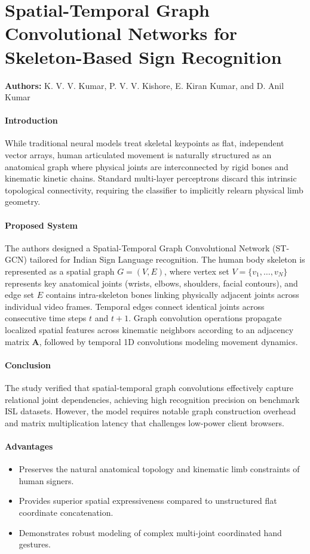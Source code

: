 \section{Spatial-Temporal Graph Convolutional Networks for Skeleton-Based Sign Recognition}
\textbf{Authors:} K. V. V. Kumar, P. V. V. Kishore, E. Kiran Kumar, and D. Anil Kumar \cite{17}

\paragraph{Introduction}
While traditional neural models treat skeletal keypoints as flat, independent vector arrays, human articulated movement is naturally structured as an anatomical graph where physical joints are interconnected by rigid bones and kinematic kinetic chains. Standard multi-layer perceptrons discard this intrinsic topological connectivity, requiring the classifier to implicitly relearn physical limb geometry.

\paragraph{Proposed System}
The authors designed a Spatial-Temporal Graph Convolutional Network (ST-GCN) tailored for Indian Sign Language recognition. The human body skeleton is represented as a spatial graph $G = (V, E)$, where vertex set $V = \{v_1, \dots, v_N\}$ represents key anatomical joints (wrists, elbows, shoulders, facial contours), and edge set $E$ contains intra-skeleton bones linking physically adjacent joints across individual video frames. Temporal edges connect identical joints across consecutive time steps $t$ and $t+1$. Graph convolution operations propagate localized spatial features across kinematic neighbors according to an adjacency matrix $\mathbf{A}$, followed by temporal 1D convolutions modeling movement dynamics.

\paragraph{Conclusion}
The study verified that spatial-temporal graph convolutions effectively capture relational joint dependencies, achieving high recognition precision on benchmark ISL datasets. However, the model requires notable graph construction overhead and matrix multiplication latency that challenges low-power client browsers.

\paragraph{Advantages}
\begin{itemize}
    \item Preserves the natural anatomical topology and kinematic limb constraints of human signers.
    \item Provides superior spatial expressiveness compared to unstructured flat coordinate concatenation.
    \item Demonstrates robust modeling of complex multi-joint coordinated hand gestures.
\end{itemize}

